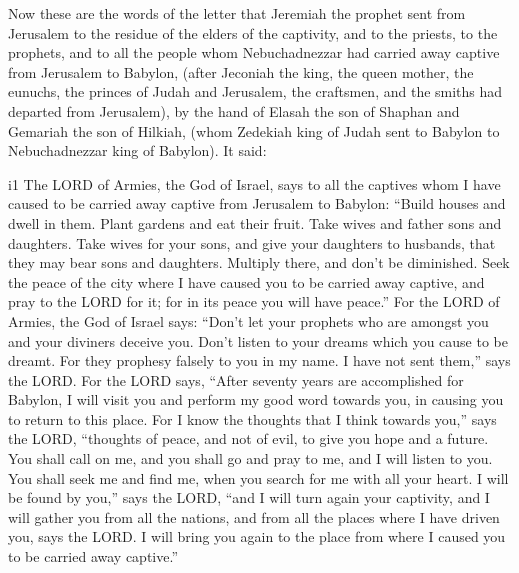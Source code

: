  Now these are the words of the letter that Jeremiah the
prophet sent from Jerusalem to the residue of the elders of the
captivity, and to the priests, to the prophets, and to all the people
whom Nebuchadnezzar had carried away captive from Jerusalem to Babylon,
 (after Jeconiah the king, the queen mother, the eunuchs,
the princes of Judah and Jerusalem, the craftsmen, and the smiths had
departed from Jerusalem),  by the hand of Elasah the son of
Shaphan and Gemariah the son of Hilkiah, (whom Zedekiah king of Judah
sent to Babylon to Nebuchadnezzar king of Babylon). It said:

i1 The LORD of Armies, the God of Israel, says to all the
captives whom I have caused to be carried away captive from Jerusalem to
Babylon:  ``Build houses and dwell in them. Plant gardens
and eat their fruit.  Take wives and father sons and
daughters. Take wives for your sons, and give your daughters to
husbands, that they may bear sons and daughters. Multiply there, and
don't be diminished.  Seek the peace of the city where I
have caused you to be carried away captive, and pray to the LORD for it;
for in its peace you will have peace.''  For the LORD of
Armies, the God of Israel says: ``Don't let your prophets who are
amongst you and your diviners deceive you. Don't listen to your dreams
which you cause to be dreamt.  For they prophesy falsely to
you in my name. I have not sent them,'' says the LORD.  For
the LORD says, ``After seventy years are accomplished for Babylon, I
will visit you and perform my good word towards you, in causing you to
return to this place.  For I know the thoughts that I think
towards you,'' says the LORD, ``thoughts of peace, and not of evil, to
give you hope and a future.  You shall call on me, and you
shall go and pray to me, and I will listen to you.  You
shall seek me and find me, when you search for me with all your heart.
 I will be found by you,'' says the LORD, ``and I will turn
again your captivity, and I will gather you from all the nations, and
from all the places where I have driven you, says the LORD. I will bring
you again to the place from where I caused you to be carried away
captive.''

